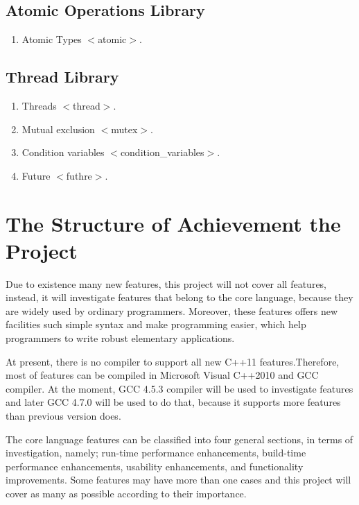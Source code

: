 \documentclass[11pt]{report}
\begin{document}
\subsection{Atomic Operations Library}
\label{sub-section:	Atomic operations library}
\begin{enumerate}
\item Atomic Types $<$atomic$>$.
\end{enumerate}

\subsection{Thread Library }
\label{sub-section: Thread library }
\begin{enumerate}
\item Threads $<$thread$>$.
\item Mutual exclusion $<$mutex$>$.
\item Condition variables $<$condition\_variables$>$.
\item Future $<$futhre$>$.
\end{enumerate}


\section{The Structure of Achievement the Project}
\label{section:The structure of achievement  the project}
Due to existence many new features, this project will not cover all features, instead, it will investigate features that belong to the core language, because they are widely used by ordinary programmers.  Moreover, these features offers new facilities such simple syntax and make programming easier, which help programmers to write robust elementary applications.

At present, there is no compiler to support all new C++11 features.\linebreak Therefore, most of features can be compiled in Microsoft Visual C++2010 and GCC compiler. At the moment,  GCC 4.5.3  compiler will be used to investigate features and later GCC 4.7.0 will be used to do that, because it supports more features than previous version does.

The core language features can be classified into four general sections, in terms of investigation, namely; run-time performance enhancements, build-time performance enhancements, usability enhancements, and functionality \linebreak improvements. Some features may have more than one cases and this project will cover as many as possible according to their importance.
\end{document}
